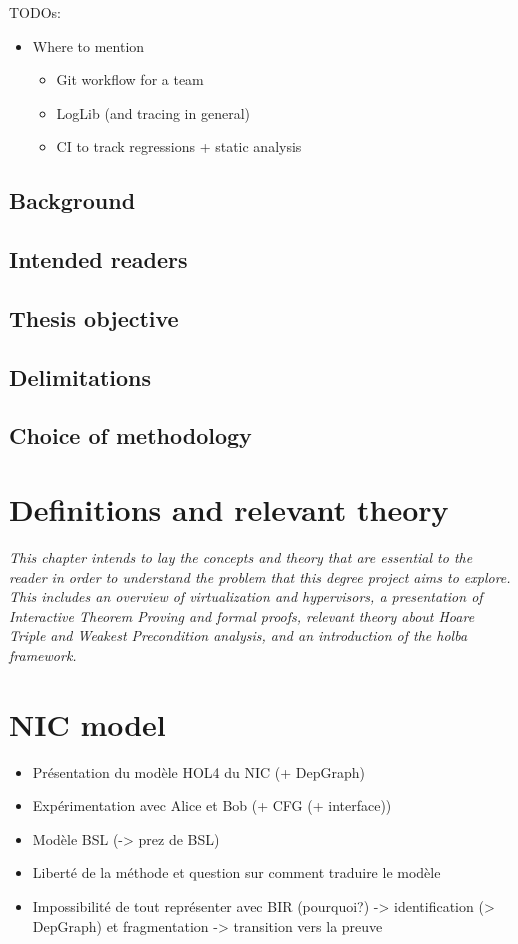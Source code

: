 \documentclass{kththesis}
\begin{document}
TODOs:
\begin{itemize}
  \item Where to mention
  \begin{itemize}
  \item Git workflow for a team
  \item LogLib (and tracing in general)
  \item CI to track regressions + static analysis
  \end{itemize}
\end{itemize}

\section{Background}

\section{Intended readers}

\section{Thesis objective}

\section{Delimitations}

\section{Choice of methodology}

\chapter{Definitions and relevant theory}
\textit{This chapter intends to lay the concepts and theory that are essential to the reader in order to understand the problem that this degree project aims to explore.  This includes an overview of virtualization and hypervisors, a presentation of Interactive Theorem Proving and formal proofs, relevant theory about Hoare Triple and Weakest Precondition analysis, and an introduction of the \gls{holba} framework.}



\chapter{NIC model}
\begin{itemize}
\item Présentation du modèle HOL4 du NIC (+ DepGraph)
\item Expérimentation avec Alice et Bob (+ CFG (+ interface))
\item Modèle BSL (-> prez de BSL)

\item Liberté de la méthode et question sur comment traduire le modèle

\item Impossibilité de tout représenter avec BIR (pourquoi?)
-> identification (> DepGraph) et fragmentation
-> transition vers la preuve
\end{itemize}
\end{document}
